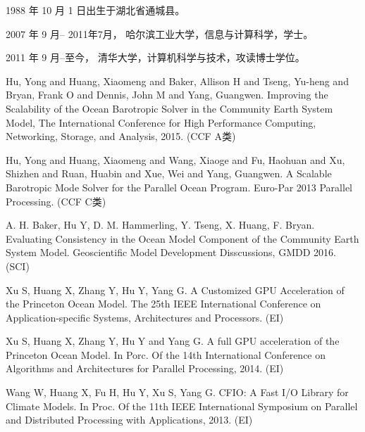 \begin{resume}


  1988 年 10 月 1 日出生于湖北省通城县。

  2007 年 9 月-- 2011年7月， 哈尔滨工业大学，信息与计算科学，学士。

  2011 年 9 月--至今， 清华大学，计算机科学与技术，攻读博士学位。


  \begin{publications}
    \item Hu, Yong and Huang, Xiaomeng and Baker, Allison H and Tseng, Yu-heng and Bryan, Frank O and Dennis, John M and Yang, Guangwen. Improving the Scalability of the Ocean Barotropic Solver in the Community Earth System Model, The International Conference for High Performance Computing, Networking, Storage, and Analysis, 2015.  (CCF A类)
    \item  Hu, Yong and Huang, Xiaomeng and Wang, Xiaoge and Fu, Haohuan and Xu, Shizhen and Ruan, Huabin and Xue, Wei and Yang, Guangwen. A Scalable Barotropic Mode Solver for the Parallel Ocean Program. Euro-Par 2013 Parallel Processing. (CCF C类) 
  \end{publications}

  \begin{publications}[before=\publicationskip,after=\publicationskip]
    \item A. H. Baker, Hu Y, D. M. Hammerling, Y. Tseng, X. Huang, F. Bryan. Evaluating Consistency in the Ocean Model Component of the Community Earth System Model. Geoscientific Model Development Disscussions, GMDD 2016. (SCI)
  \end{publications}

  \begin{publications}
    \item Xu S, Huang X, Zhang Y, Hu Y, Yang G. A Customized GPU Acceleration of the Princeton Ocean Model. The 25th IEEE International Conference on Application-specific Systems, Architectures and Processors. (EI)
    \item Xu S, Huang X, Zhang Y, Hu Y and Yang G. A full GPU acceleration of the Princeton Ocean Model. In Porc. Of the 14th International Conference on Algorithms and Architectures for Parallel Processing, 2014. (EI)
    \item Wang W, Huang X, Fu H, Hu Y, Xu S, Yang G. CFIO: A Fast I/O Library for Climate Models. In Proc. Of the 11th IEEE International Symposium on Parallel and Distributed Processing with Applications, 2013. (EI)


\end{publications}
\end{resume}
